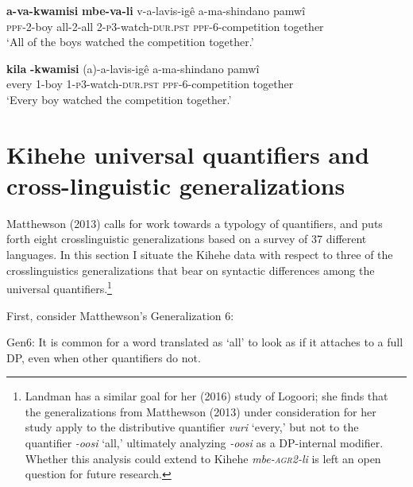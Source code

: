 \documentclass[letterpaper, 12pt]{article}
\begin{document}
\begin{exe}

\ex  \label{competition} \begin{xlist}

\ex \gll \textbf{a-va-kwamisi} \textbf{mbe-va-li} v-a-lavis-ig\^e a-ma-shindano pamw\^i \\
\textsc{ppf}-2-boy all-2-all 2-\textsc{p3}-watch-\textsc{dur.pst} \textsc{ppf}-6-competition together\\
`All of the boys watched the competition together.'\\

\vspace{5mm}

\ex \label{everytogether} \gll * \textbf{kila} \textbf{-kwamisi} (a)-a-lavis-ig\^e a-ma-shindano pamw\^i \\
{} every 1-boy 1-\textsc{p3}-watch-\textsc{dur.pst} \textsc{ppf}-6-competition together \\
`Every boy watched the competition together.'

\end{xlist}
\end{exe}

 

\section{Kihehe universal quantifiers and cross-linguistic generalizations}  \label{type}

Matthewson (2013) calls for work towards a typology of quantifiers, and puts forth eight crosslinguistic generalizations based on a survey of 37 different languages. In this section I situate the Kihehe data with respect to three of the crosslinguistics generalizations that bear on syntactic differences among the universal quantifiers.\footnote{Landman has a similar goal for her (2016) study of Logoori; she finds that the generalizations from Matthewson (2013) under consideration for her study apply to the distributive quantifier \textit{vuri} `every,' but not to the quantifier \textit{-oosi} `all,' ultimately analyzing \textit{-oosi} as a DP-internal modifier. Whether this analysis could extend to Kihehe \textit{mbe-\textsc{agr2}-li} is left an open question for future research.}  



First, consider Matthewson's Generalization 6:

\begin{exe}
\singlespacing
\ex Gen6: It is common for a word translated as `all' to look as if it attaches to a full DP, even when other quantifiers do not. \cite[p. 35]{matthewson13} \\
\end{exe}
\end{document}
